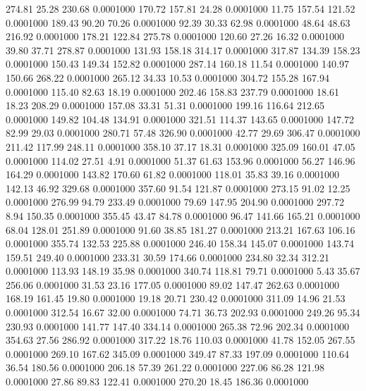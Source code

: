  274.81   25.28  230.68   0.0001000
 170.72  157.81   24.28   0.0001000
  11.75  157.54  121.52   0.0001000
 189.43   90.20   70.26   0.0001000
  92.39   30.33   62.98   0.0001000
  48.64   48.63  216.92   0.0001000
 178.21  122.84  275.78   0.0001000
 120.60   27.26   16.32   0.0001000
  39.80   37.71  278.87   0.0001000
 131.93  158.18  314.17   0.0001000
 317.87  134.39  158.23   0.0001000
 150.43  149.34  152.82   0.0001000
 287.14  160.18   11.54   0.0001000
 140.97  150.66  268.22   0.0001000
 265.12   34.33   10.53   0.0001000
 304.72  155.28  167.94   0.0001000
 115.40   82.63   18.19   0.0001000
 202.46  158.83  237.79   0.0001000
  18.61   18.23  208.29   0.0001000
 157.08   33.31   51.31   0.0001000
 199.16  116.64  212.65   0.0001000
 149.82  104.48  134.91   0.0001000
 321.51  114.37  143.65   0.0001000
 147.72   82.99   29.03   0.0001000
 280.71   57.48  326.90   0.0001000
  42.77   29.69  306.47   0.0001000
 211.42  117.99  248.11   0.0001000
 358.10   37.17   18.31   0.0001000
 325.09  160.01   47.05   0.0001000
 114.02   27.51    4.91   0.0001000
  51.37   61.63  153.96   0.0001000
  56.27  146.96  164.29   0.0001000
 143.82  170.60   61.82   0.0001000
 118.01   35.83   39.16   0.0001000
 142.13   46.92  329.68   0.0001000
 357.60   91.54  121.87   0.0001000
 273.15   91.02   12.25   0.0001000
 276.99   94.79  233.49   0.0001000
  79.69  147.95  204.90   0.0001000
 297.72    8.94  150.35   0.0001000
 355.45   43.47   84.78   0.0001000
  96.47  141.66  165.21   0.0001000
  68.04  128.01  251.89   0.0001000
  91.60   38.85  181.27   0.0001000
 213.21  167.63  106.16   0.0001000
 355.74  132.53  225.88   0.0001000
 246.40  158.34  145.07   0.0001000
 143.74  159.51  249.40   0.0001000
 233.31   30.59  174.66   0.0001000
 234.80   32.34  312.21   0.0001000
 113.93  148.19   35.98   0.0001000
 340.74  118.81   79.71   0.0001000
   5.43   35.67  256.06   0.0001000
  31.53   23.16  177.05   0.0001000
  89.02  147.47  262.63   0.0001000
 168.19  161.45   19.80   0.0001000
  19.18   20.71  230.42   0.0001000
 311.09   14.96   21.53   0.0001000
 312.54   16.67   32.00   0.0001000
  74.71   36.73  202.93   0.0001000
 249.26   95.34  230.93   0.0001000
 141.77  147.40  334.14   0.0001000
 265.38   72.96  202.34   0.0001000
 354.63   27.56  286.92   0.0001000
 317.22   18.76  110.03   0.0001000
  41.78  152.05  267.55   0.0001000
 269.10  167.62  345.09   0.0001000
 349.47   87.33  197.09   0.0001000
 110.64   36.54  180.56   0.0001000
 206.18   57.39  261.22   0.0001000
 227.06   86.28  121.98   0.0001000
  27.86   89.83  122.41   0.0001000
 270.20   18.45  186.36   0.0001000
